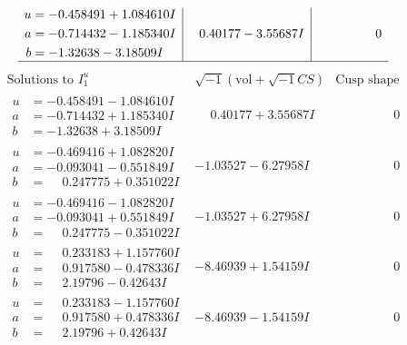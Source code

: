\documentclass[1p]{elsarticle_modified}
\theoremstyle{definition}
\newcommand{\I}{\sqrt{-1}}
\begin{document}
$$\begin{array}{c|c|c}
\begin{aligned}
u &= -0.458491 + 1.084610 I \\
a &= -0.714432 - 1.185340 I \\
b &= -1.32638 - 3.18509 I\end{aligned}
 & \phantom{-}0.40177 - 3.55687 I & \phantom{-0.000000 } 0\\
 \hline 
 \end{array}$$\newpage$$\begin{array}{c|c|c}  
\text{Solutions to }I^u_{1}& \I (\text{vol} + \sqrt{-1}CS) & \text{Cusp shape}\\
 \hline 
\begin{aligned}
u &= -0.458491 - 1.084610 I \\
a &= -0.714432 + 1.185340 I \\
b &= -1.32638 + 3.18509 I\end{aligned}
 & \phantom{-}0.40177 + 3.55687 I & \phantom{-0.000000 } 0 \\ \hline\begin{aligned}
u &= -0.469416 + 1.082820 I \\
a &= -0.093041 - 0.551849 I \\
b &= \phantom{-}0.247775 + 0.351022 I\end{aligned}
 & -1.03527 - 6.27958 I & \phantom{-0.000000 } 0 \\ \hline\begin{aligned}
u &= -0.469416 - 1.082820 I \\
a &= -0.093041 + 0.551849 I \\
b &= \phantom{-}0.247775 - 0.351022 I\end{aligned}
 & -1.03527 + 6.27958 I & \phantom{-0.000000 } 0 \\ \hline\begin{aligned}
u &= \phantom{-}0.233183 + 1.157760 I \\
a &= \phantom{-}0.917580 - 0.478336 I \\
b &= \phantom{-}2.19796 - 0.42643 I\end{aligned}
 & -8.46939 + 1.54159 I & \phantom{-0.000000 } 0 \\ \hline\begin{aligned}
u &= \phantom{-}0.233183 - 1.157760 I \\
a &= \phantom{-}0.917580 + 0.478336 I \\
b &= \phantom{-}2.19796 + 0.42643 I\end{aligned}
 & -8.46939 - 1.54159 I & \phantom{-0.000000 } 0 \\ \hline\begin{aligned}

\end{aligned}
\end{array}$$
\end{document}
